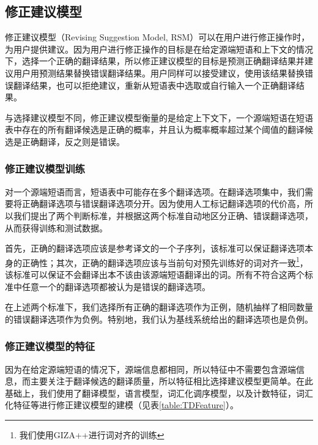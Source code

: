 \documentclass[master, winfont]{njuthesis}
\begin{document}
\subsection {修正建议模型}
\label{sec:rsm}
修正建议模型（Revising Suggestion Model, RSM）可以在用户进行修正操作时，为用户提供建议。因为用户进行修正操作的目标是在给定源端短语和上下文的情况下，选择一个正确的翻译结果，所以修正建议模型的目标是预测正确翻译结果并建议用户用预测结果替换错误翻译结果。用户同样可以接受建议，使用该结果替换错误翻译结果，也可以拒绝建议，重新从短语表中选取或自行输入一个正确翻译结果。

与选择建议模型不同，修正建议模型衡量的是给定上下文下，一个源端短语在短语表中存在的所有翻译候选是正确的概率，并且认为概率概率超过某个阈值的翻译候选是正确翻译，反之则是错误。

\subsubsection{修正建议模型训练}\label{sec:rsmtraining}
对一个源端短语而言，短语表中可能存在多个翻译选项。在翻译选项集中，我们需要将正确翻译选项与错误翻译选项分开。因为使用人工标记翻译选项的代价高，所以我们提出了两个判断标准，并根据这两个标准自动地区分正确、错误翻译选项，从而获得训练和测试数据。

首先，正确的翻译选项应该是参考译文的一个子序列，该标准可以保证翻译选项本身的正确性；其次，正确的翻译选项应该与当前句对预先训练好的词对齐一致\footnote{我们使用GIZA++\cite{och03:asc}进行词对齐的训练}，该标准可以保证不会翻译出本不该由该源端短语翻译出的词。所有不符合这两个标准中任意一个的翻译选项都被认为是错误的翻译选项。

在上述两个标准下，我们选择所有正确的翻译选项作为正例，随机抽样了相同数量的错误翻译选项作为负例。特别地，我们认为基线系统给出的翻译选项也是负例。
\subsubsection{修正建议模型的特征}
因为在给定源端短语的情况下，源端信息都相同，所以特征中不需要包含源端信息，而主要关注于翻译候选的翻译质量，所以特征相比选择建议模型更简单。在此基础上，我们使用了翻译模型，语言模型，词汇化调序模型，以及计数特征，词汇化特征等进行修正建议模型的建模（见表\ref{table:TDFeature}）。
\end{document}

